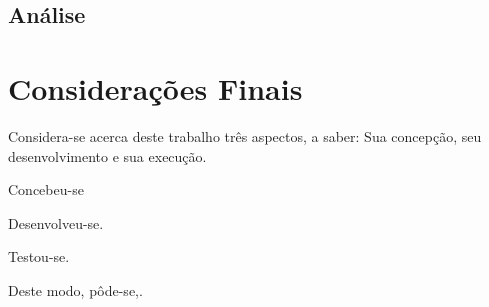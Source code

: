 \documentclass[12pt]{article}
\begin{document}
	\subsection{Análise}\label{sec:analise}

\section{Considerações Finais}\label{sec:conclusao}
	
	Considera-se acerca deste trabalho três aspectos, a saber: Sua concepção, seu desenvolvimento e sua execução.

	Concebeu-se

	Desenvolveu-se.

	Testou-se.

	Deste modo, pôde-se,.




\end{document}
